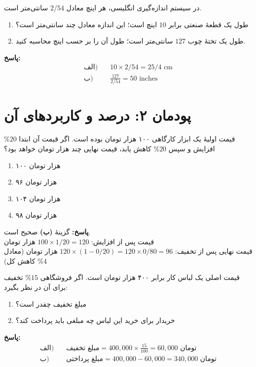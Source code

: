 \documentclass[a4paper,12pt]{article}
\begin{document}
\begin{tcolorbox}[title=\textbf{سؤال ۳ (تشریحی)}]
در سیستم اندازه‌گیری انگلیسی، هر اینچ معادل $2/54$ سانتی‌متر است.
\begin{enumerate}[label=\textbf{\alph*)}]
    \item طول یک قطعۀ صنعتی برابر $10$ اینچ است؛ این اندازه معادل چند سانتی‌متر است؟
    \item طول یک تختۀ چوب $127$ سانتی‌متر است؛ طول آن را بر حسب اینچ محاسبه کنید.
\end{enumerate}
\textbf{پاسخ:}
\begin{align*}
\text{الف)} \quad & 10 \times 2/54 = 25/4 \text{ cm} \\
\text{ب)} \quad & \frac{127}{2/54} = 50 \text{ inches}
\end{align*}
\end{tcolorbox}

\newpage

\section*{پودمان ۲: درصد و کاربردهای آن}

\begin{tcolorbox}[title=\textbf{سؤال ۴ (تستی)}]
قیمت اولیۀ یک ابزار کارگاهی ۱۰۰ هزار تومان بوده است. اگر قیمت آن ابتدا $\%20$ افزایش و سپس $\%20$ کاهش یابد، قیمت نهایی چند هزار تومان خواهد بود؟
\begin{enumerate}[label=\textbf{(\alph*)}]
    \item ۱۰۰ هزار تومان
    \item ۹۶ هزار تومان
    \item ۱۰۴ هزار تومان
    \item ۹۸ هزار تومان
\end{enumerate}
\textbf{پاسخ:} گزینۀ \textbf{(ب)} صحیح است.
\\
قیمت پس از افزایش: $100 \times 1/20 = 120$ هزار تومان
\\
قیمت نهایی پس از تخفیف: $120 \times (1 - 0/20) = 120 \times 0/80 = 96$ هزار تومان (معادل $\%4$ کاهش کل)
\end{tcolorbox}

\begin{tcolorbox}[title=\textbf{سؤال ۵ (تشریحی)}]
قیمت اصلی یک لباس کار برابر ۴۰۰ هزار تومان است. اگر فروشگاهی $\%15$ تخفیف برای آن در نظر بگیرد:
\begin{enumerate}[label=\textbf{\alph*)}]
    \item مبلغ تخفیف چقدر است؟
    \item خریدار برای خرید این لباس چه مبلغی باید پرداخت کند؟
\end{enumerate}
\textbf{پاسخ:}
\begin{align*}
\text{الف)} \quad & \text{مبلغ تخفیف} = 400,000 \times \frac{15}{100} = 60,000 \text{ تومان} \\
\text{ب)} \quad & \text{مبلغ پرداختی} = 400,000 - 60,000 = 340,000 \text{ تومان}
\end{align*}
\end{tcolorbox}
\end{document}

